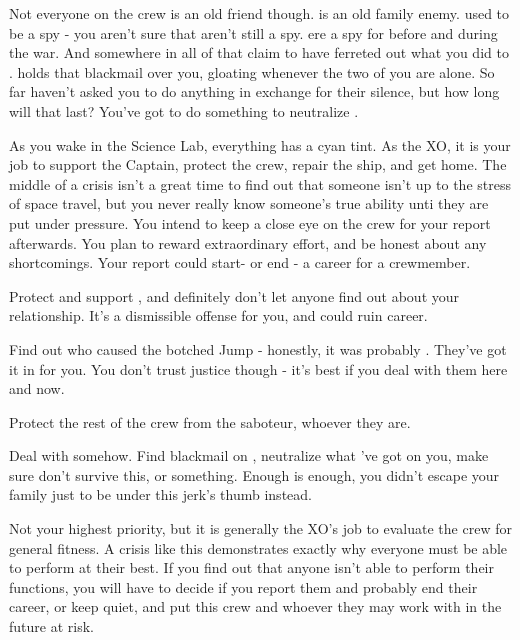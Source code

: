 \documentclass[char]{TMFHope}
\begin{document}
Not everyone on the crew is an old friend though. \cDip{} is an old family enemy. \cDip{\They} used to be a spy - you aren't sure that \cDip{\they} aren't still a spy. \cDip{\They}ere a spy for \pPlan{} before and during the war. And somewhere in all of that \cDip{\they} claim to have ferreted out what you did to \cCap{}. \cDip{} holds that blackmail over you, gloating whenever the two of you are alone. So far \cDip{\they} haven't asked you to do anything in exchange for their silence, but how long will that last? You've got to do something to neutralize \cDip{\them}.

As you wake in the Science Lab, everything has a cyan tint.  As the XO, it is your job to support the Captain, protect the crew, repair the ship, and get home. The middle of a crisis isn't a great time to find out that someone isn't up to the stress of space travel, but you never really know someone's true ability unti they are put under pressure. You intend to keep a close eye on the crew for your report afterwards. You plan to reward extraordinary effort, and be honest about any shortcomings. Your report could start- or end - a career for a crewmember.

\begin{itemz}[Goals]
	\item Protect and support \cSci{}, and definitely don't let anyone find out about your relationship. It's a dismissible offense for you, and could ruin \cSci{\their} career.
	\item Find out who caused the botched Jump - honestly, it was probably \cDip{}. They've got it in for you. You don't trust \pPlan{} justice though - it's best if you deal with them here and now.
	\item Protect the rest of the crew from the saboteur, whoever they are.
	\item Deal with \cDip{} somehow. Find blackmail on \cDip{\them}, neutralize what \cDip{\they}'ve got on you, make sure \cDip{\they} don't survive this, or something. Enough is enough, you didn't escape your family just to be under this jerk's thumb instead.
	\item Not your highest priority, but it is generally the XO's job to evaluate the crew for general fitness. A crisis like this demonstrates exactly why everyone must be able to perform at their best. If you find out that anyone isn't able to perform their functions, you will have to decide if you report them and probably end their career, or keep quiet, and put this crew and whoever they may work with in the future at risk.
\end{itemz}
\end{document}
